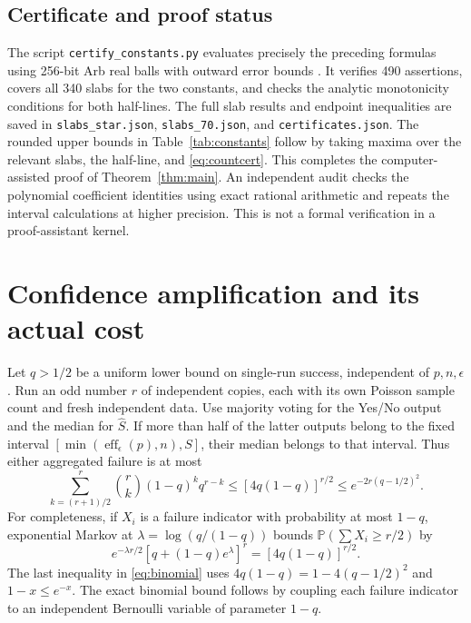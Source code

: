 \documentclass[10pt]{article}
\newcommand{\Prb}{\mathbb P}
\newcommand{\eff}{\operatorname{eff}}
\begin{document}
\subsection{Certificate and proof status}
The script \texttt{certify\_constants.py} evaluates precisely the preceding
formulas using 256-bit Arb real balls with outward error bounds
\cite{arb}. It verifies
490 assertions, covers all 340 slabs for the two constants, and checks the
analytic monotonicity conditions for both half-lines. The full slab results
and endpoint inequalities are saved in \texttt{slabs\_star.json},
\texttt{slabs\_70.json}, and \texttt{certificates.json}.
The rounded upper bounds in Table~\ref{tab:constants} follow by taking maxima
over the relevant slabs, the half-line, and \eqref{eq:countcert}.
This completes the computer-assisted proof of Theorem~\ref{thm:main}.
An independent audit checks the polynomial coefficient identities using
exact rational arithmetic and repeats the interval calculations at higher
precision. This is not a formal verification in a proof-assistant kernel.

\section{Confidence amplification and its actual cost}
Let $q>1/2$ be a uniform lower bound on single-run success, independent of
$p,n,\epsilon$. Run an odd number $r$ of independent copies, each with its
own Poisson sample count and fresh independent data.
Use majority voting for the Yes/No output and the median for
$\widehat S$. If more than half of the latter outputs belong to the fixed
interval $[\min(\eff_\epsilon(p),n),S]$, their median belongs to that interval.
Thus either aggregated failure is at most
\begin{equation}\label{eq:binomial}
 \sum_{k=(r+1)/2}^r {r\choose k}(1-q)^kq^{r-k}
 \le [4q(1-q)]^{r/2}
 \le e^{-2r(q-1/2)^2}.
\end{equation}
For completeness, if $X_i$ is a failure indicator with probability at most
$1-q$, exponential Markov at $\lambda=\log(q/(1-q))$ bounds
$\Prb(\sum X_i\ge r/2)$ by
\[
 e^{-\lambda r/2}[q+(1-q)e^\lambda]^r=[4q(1-q)]^{r/2}.
\]
The last inequality in \eqref{eq:binomial} uses
$4q(1-q)=1-4(q-1/2)^2$ and $1-x\le e^{-x}$.
The exact binomial bound follows by coupling each failure indicator to an
independent Bernoulli variable of parameter $1-q$.
\end{document}
